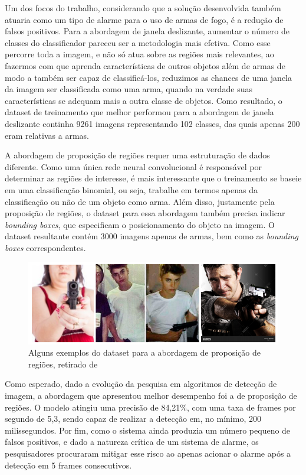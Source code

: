 \documentclass[]{politex}
\begin{document}
Um dos focos do trabalho, considerando que a solução desenvolvida também atuaria como um tipo de alarme para o uso de armas de fogo, é a redução de falsos positivos. Para a abordagem de janela deslizante, aumentar o número de classes do classificador pareceu ser a metodologia mais efetiva. Como esse percorre toda a imagem, e não só atua sobre as regiões mais relevantes, ao fazermos com que aprenda características de outros objetos além de armas de modo a também ser capaz de classificá-los, reduzimos as chances de uma janela da imagem ser classificada como uma arma, quando na verdade suas características se adequam mais a outra classe de objetos. Como resultado, o dataset de treinamento que melhor performou para a abordagem de janela deslizante continha 9261 imagens representando 102 classes, das quais apenas 200 eram relativas a armas.

A abordagem de proposição de regiões requer uma estruturação de dados diferente. Como uma única rede neural convolucional é responsável por determinar as regiões de interesse, é mais interessante que o treinamento se baseie em uma classificação binomial, ou seja, trabalhe em termos apenas da classificação ou não de um objeto como arma. Além disso, justamente pela proposição de regiões, o dataset para essa abordagem também precisa indicar \textit{bounding boxes}, que especificam o posicionamento do objeto na imagem. O dataset resultante contém 3000 imagens apenas de armas, bem como as \textit{bounding boxes} correspondentes.

\begin{figure}[ht]
  \centering
  \includegraphics[scale=0.5]{img/dataset.png}
  \caption{Alguns exemplos do dataset para a abordagem de proposição de regiões, retirado de \citeyear{olmos1} \citeauthor{olmos1}}
  \label{fig:dataset}
\end{figure}

Como esperado, dado a evolução da pesquisa em algoritmos de detecção de imagem, a abordagem que apresentou melhor desempenho foi a de proposição de regiões. O modelo atingiu uma precisão de 84,21\%, com uma taxa de frames por segundo de 5,3, sendo capaz de realizar a detecção em, no mínimo, 200 milissegundos. Por fim, como o sistema ainda produzia um número pequeno de falsos positivos, e dado a natureza crítica de um sistema de alarme, os pesquisadores procuraram mitigar esse risco ao apenas acionar o alarme após a detecção em 5 frames consecutivos.
\end{document}
